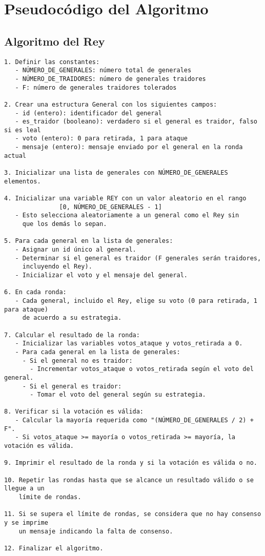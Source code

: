 \documentclass[a4paper,12pt]{article}
\begin{document}
\section*{Pseudocódigo del Algoritmo}

\subsection*{Algoritmo del Rey}
\begin{verbatim}
1. Definir las constantes:
   - NÚMERO_DE_GENERALES: número total de generales
   - NÚMERO_DE_TRAIDORES: número de generales traidores
   - F: número de generales traidores tolerados

2. Crear una estructura General con los siguientes campos:
   - id (entero): identificador del general
   - es_traidor (booleano): verdadero si el general es traidor, falso si es leal
   - voto (entero): 0 para retirada, 1 para ataque
   - mensaje (entero): mensaje enviado por el general en la ronda actual

3. Inicializar una lista de generales con NÚMERO_DE_GENERALES elementos.

4. Inicializar una variable REY con un valor aleatorio en el rango
               [0, NÚMERO_DE_GENERALES - 1]
   - Esto selecciona aleatoriamente a un general como el Rey sin 
     que los demás lo sepan.

5. Para cada general en la lista de generales:
   - Asignar un id único al general.
   - Determinar si el general es traidor (F generales serán traidores,
     incluyendo el Rey).
   - Inicializar el voto y el mensaje del general.

6. En cada ronda:
   - Cada general, incluido el Rey, elige su voto (0 para retirada, 1 para ataque) 
     de acuerdo a su estrategia.

7. Calcular el resultado de la ronda:
   - Inicializar las variables votos_ataque y votos_retirada a 0.
   - Para cada general en la lista de generales:
     - Si el general no es traidor:
       - Incrementar votos_ataque o votos_retirada según el voto del general.
     - Si el general es traidor:
       - Tomar el voto del general según su estrategia.

8. Verificar si la votación es válida:
   - Calcular la mayoría requerida como "(NÚMERO_DE_GENERALES / 2) + F".
   - Si votos_ataque >= mayoría o votos_retirada >= mayoría, la votación es válida.

9. Imprimir el resultado de la ronda y si la votación es válida o no.

10. Repetir las rondas hasta que se alcance un resultado válido o se llegue a un 
    límite de rondas.

11. Si se supera el límite de rondas, se considera que no hay consenso y se imprime
    un mensaje indicando la falta de consenso.

12. Finalizar el algoritmo.

\end{verbatim}
\end{document}
